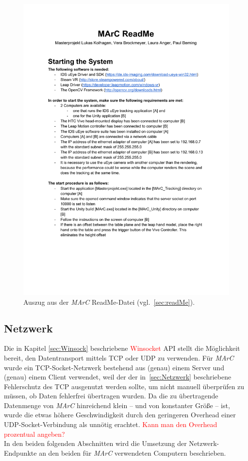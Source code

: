 \begin{figure}
	\centering
	\includegraphics[page=1, trim=1cm 12.25cm 1cm 5.25cm, clip, width=\textwidth]{kapitel/anhang/ReadMe.pdf} 
	\caption{Auszug aus der \emph{MArC} ReadMe-Datei (vgl.~\ref{sec:readMe}).}
	\label{fig:marcReadMe}
\end{figure}

\subsection{Netzwerk}\label{sec:netzwerk}
Die in Kapitel \ref{sec:Winsock} beschriebene  \textcolor{red}{Winsocket} API stellt die Möglichkeit bereit, den Datentransport mittels TCP oder UDP zu verwenden. Für \emph{MArC} wurde ein TCP-Socket-Netzwerk bestehend aus (genau) einem Server und (genau) einem Client verwendet, weil der der in~\ref{sec:Netzwerk} beschriebene Fehlerschutz des TCP ausgenutzt werden sollte, um nicht manuell überprüfen zu müssen, ob Daten fehlerfrei übertragen wurden. Da die zu übertragende Datenmenge von \emph{MArC} hinreichend klein -- und von konstanter Größe -- ist, wurde die etwas höhere Geschwindigkeit durch den geringeren Overhead einer UDP-Socket-Verbindung als unnötig erachtet. \textcolor{red}{Kann man den Overhead prozentual angeben?} \\
In den beiden folgenden Abschnitten wird die Umsetzung der Netzwerk-Endpunkte an den beiden für \emph{MArC} verwendeten Computern beschrieben.
